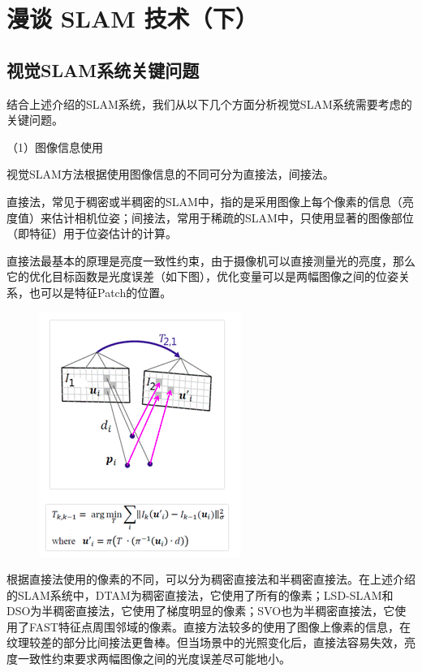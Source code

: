 \section{漫谈 SLAM 技术（下）}

\subsection{视觉SLAM系统关键问题}

结合上述介绍的SLAM系统，我们从以下几个方面分析视觉SLAM系统需要考虑的关键问题。

（1）图像信息使用

视觉SLAM方法根据使用图像信息的不同可分为直接法，间接法。

直接法，常见于稠密或半稠密的SLAM中，指的是采用图像上每个像素的信息（亮度值）来估计相机位姿；间接法，常用于稀疏的SLAM中，只使用显著的图像部位（即特征）用于位姿估计的计算。

直接法最基本的原理是亮度一致性约束，由于摄像机可以直接测量光的亮度，那么它的优化目标函数是光度误差（如下图），优化变量可以是两幅图像之间的位姿关系，也可以是特征Patch的位置。

\begin{figure}[H]%
	\centering  %
	\includegraphics[width=0.7\linewidth]{image/Talk/16.png}  %

\end{figure}


根据直接法使用的像素的不同，可以分为稠密直接法和半稠密直接法。在上述介绍的SLAM系统中，DTAM为稠密直接法，它使用了所有的像素；LSD-SLAM和DSO为半稠密直接法，它使用了梯度明显的像素；SVO也为半稠密直接法，它使用了FAST特征点周围邻域的像素。直接方法较多的使用了图像上像素的信息，在纹理较差的部分比间接法更鲁棒。但当场景中的光照变化后，直接法容易失效，亮度一致性约束要求两幅图像之间的光度误差尽可能地小。

